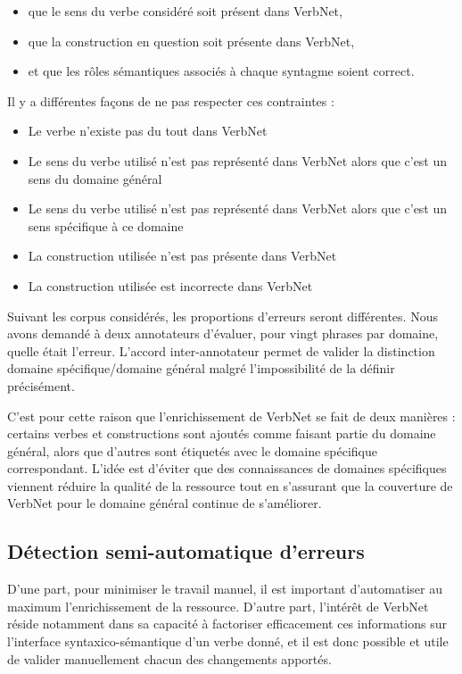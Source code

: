 \begin{itemize}
    \item que le sens du verbe considéré soit présent dans VerbNet,
    \item que la construction en question soit présente dans VerbNet,
    \item et que les rôles sémantiques associés à chaque syntagme soient correct.
\end{itemize}

Il y a différentes façons de ne pas respecter ces contraintes :

\begin{itemize}
    \item Le verbe n'existe pas du tout dans VerbNet
    \item Le sens du verbe utilisé n'est pas représenté dans VerbNet alors que c'est un sens du domaine général
    \item Le sens du verbe utilisé n'est pas représenté dans VerbNet alors que c'est un sens spécifique à ce domaine
    \item La construction utilisée n'est pas présente dans VerbNet
    \item La construction utilisée est incorrecte dans VerbNet
\end{itemize}

Suivant les corpus considérés, les proportions d'erreurs seront différentes.
Nous avons demandé à deux annotateurs d'évaluer, pour vingt phrases par
domaine, quelle était l'erreur. L'accord inter-annotateur permet de valider la
distinction domaine spécifique/domaine général malgré l'impossibilité de la
définir précisément. %

C'est pour cette raison que l'enrichissement de VerbNet se fait de deux
manières : certains verbes et constructions sont ajoutés comme faisant partie
du domaine général, alors que d'autres sont étiquetés avec le domaine
spécifique correspondant. L'idée est d'éviter que des connaissances de domaines
spécifiques viennent réduire la qualité de la ressource tout en s'assurant que
la couverture de VerbNet pour le domaine général continue de s'améliorer.

\subsection{Détection semi-automatique d'erreurs}

D'une part, pour minimiser le travail manuel, il est important d'automatiser au
maximum l'enrichissement de la ressource. D'autre part, l'intérêt de VerbNet
réside notamment dans sa capacité à factoriser efficacement ces informations
sur l'interface syntaxico-sémantique d'un verbe donné, et il est donc possible
et utile de valider manuellement chacun des changements apportés.

